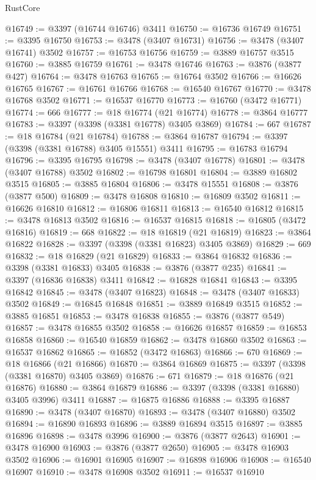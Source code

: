 \begin{lexlean}{RustCore}
\begin{coremodule}
@16749 := @3397 (@16744 @16746) @3411
@16750 := @16736 @16749
@16751 := @3395 @16750
@16753 := @3478 (@3407 @16731)
@16756 := @3478 (@3407 @16741) @3502
@16757 := @16753 @16756
@16759 := @3889 @16757 @3515
@16760 := @3885 @16759
@16761 := @3478 @16746
@16763 := @3876 (@3877 @427)
@16764 := @3478 @16763
@16765 := @16764 @3502
@16766 := @16626 @16765
@16767 := @16761 @16766
@16768 := @16540 @16767
@16770 := @3478 @16768 @3502
@16771 := @16537 @16770
@16773 := @16760 (@3472 @16771)
@16774 := 666
@16777 := @18 @16774 (@21 @16774)
@16778 := @3864 @16777
@16783 := @3397 (@3398 (@3381 @16778) @3405 @3869)
@16784 := 667
@16787 := @18 @16784 (@21 @16784)
@16788 := @3864 @16787
@16794 := @3397 (@3398 (@3381 @16788) @3405 @15551) @3411
@16795 := @16783 @16794
@16796 := @3395 @16795
@16798 := @3478 (@3407 @16778)
@16801 := @3478 (@3407 @16788) @3502
@16802 := @16798 @16801
@16804 := @3889 @16802 @3515
@16805 := @3885 @16804
@16806 := @3478 @15551
@16808 := @3876 (@3877 @500)
@16809 := @3478 @16808
@16810 := @16809 @3502
@16811 := @16626 @16810
@16812 := @16806 @16811
@16813 := @16540 @16812
@16815 := @3478 @16813 @3502
@16816 := @16537 @16815
@16818 := @16805 (@3472 @16816)
@16819 := 668
@16822 := @18 @16819 (@21 @16819)
@16823 := @3864 @16822
@16828 := @3397 (@3398 (@3381 @16823) @3405 @3869)
@16829 := 669
@16832 := @18 @16829 (@21 @16829)
@16833 := @3864 @16832
@16836 := @3398 (@3381 @16833) @3405
@16838 := @3876 (@3877 @235)
@16841 := @3397 (@16836 @16838) @3411
@16842 := @16828 @16841
@16843 := @3395 @16842
@16845 := @3478 (@3407 @16823)
@16848 := @3478 (@3407 @16833) @3502
@16849 := @16845 @16848
@16851 := @3889 @16849 @3515
@16852 := @3885 @16851
@16853 := @3478 @16838
@16855 := @3876 (@3877 @549)
@16857 := @3478 @16855 @3502
@16858 := @16626 @16857
@16859 := @16853 @16858
@16860 := @16540 @16859
@16862 := @3478 @16860 @3502
@16863 := @16537 @16862
@16865 := @16852 (@3472 @16863)
@16866 := 670
@16869 := @18 @16866 (@21 @16866)
@16870 := @3864 @16869
@16875 := @3397 (@3398 (@3381 @16870) @3405 @3869)
@16876 := 671
@16879 := @18 @16876 (@21 @16876)
@16880 := @3864 @16879
@16886 := @3397 (@3398 (@3381 @16880) @3405 @3996) @3411
@16887 := @16875 @16886
@16888 := @3395 @16887
@16890 := @3478 (@3407 @16870)
@16893 := @3478 (@3407 @16880) @3502
@16894 := @16890 @16893
@16896 := @3889 @16894 @3515
@16897 := @3885 @16896
@16898 := @3478 @3996
@16900 := @3876 (@3877 @2643)
@16901 := @3478 @16900
@16903 := @3876 (@3877 @2650)
@16905 := @3478 @16903 @3502
@16906 := @16901 @16905
@16907 := @16898 @16906
@16908 := @16540 @16907
@16910 := @3478 @16908 @3502
@16911 := @16537 @16910

\end{coremodule}
\end{lexlean}
